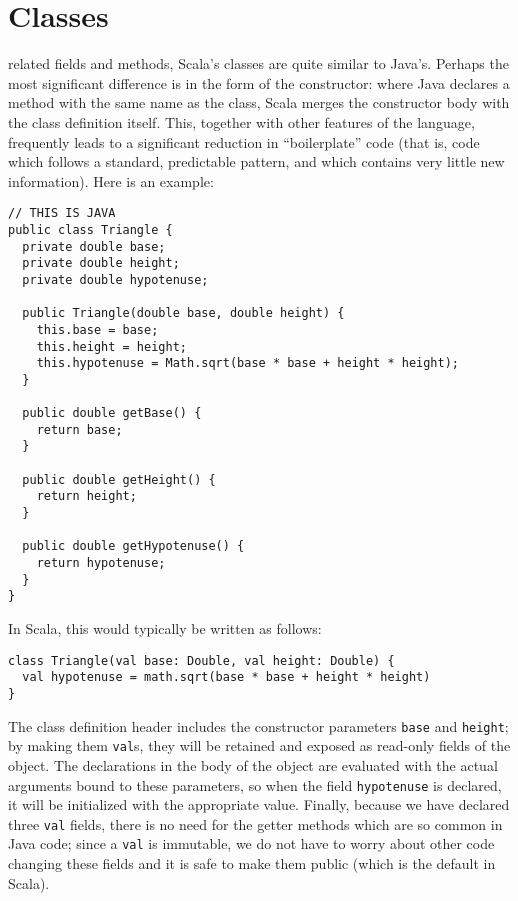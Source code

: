 \section{Classes}
 related fields and methods, Scala's classes are quite similar to Java's. Perhaps the most significant difference is in the form of the constructor: where Java declares a method with the same name as the class, Scala merges the constructor body with the class definition itself. This, together with other features of the language, frequently leads to a significant reduction in ``boilerplate'' code (that is, code which follows a standard, predictable pattern, and which contains very little new information). Here is an example:
\begin{verbatim}
// THIS IS JAVA
public class Triangle {
  private double base;
  private double height;
  private double hypotenuse;

  public Triangle(double base, double height) {
    this.base = base;
    this.height = height;
    this.hypotenuse = Math.sqrt(base * base + height * height);
  }

  public double getBase() {
    return base;
  }

  public double getHeight() {
    return height;
  }

  public double getHypotenuse() {
    return hypotenuse;
  }
}
\end{verbatim}
In Scala, this would typically be written as follows:
\begin{verbatim}
class Triangle(val base: Double, val height: Double) {
  val hypotenuse = math.sqrt(base * base + height * height)
}
\end{verbatim}
The class definition header includes the constructor parameters \texttt{base} and \texttt{height}; by making them \texttt{val}s, they will be retained and exposed as read-only fields of the object. The declarations in the body of the object are evaluated with the actual arguments bound to these parameters, so when the field \texttt{hypotenuse} is declared, it will be initialized with the appropriate value. Finally, because we have declared three \texttt{val} fields, there is no need for the getter methods which are so common in Java code; since a \texttt{val} is immutable, we do not have to worry about other code changing these fields and it is safe to make them public (which is the default in Scala).

